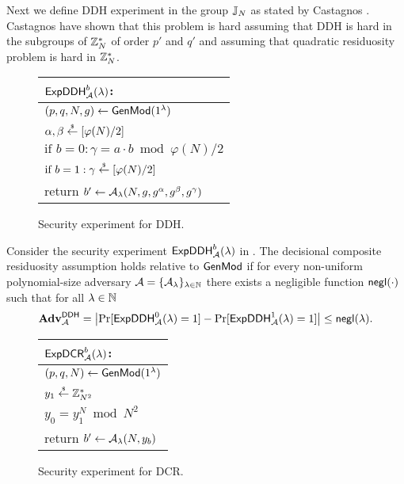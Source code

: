Next we define DDH experiment in the group $\mathbb{J}_N$ as stated by Castagnos \etal \cite{C:CouPetPoi16}. Castagnos \etal have shown that this problem is hard assuming that DDH is hard in the subgroups of $\mathbb{Z}_N^*$ of order $p'$ and $q'$ and assuming that quadratic residuosity problem is hard in $\mathbb{Z}_N^*$.  

\begin{figure}[h]
\begin{center}
\begin{tabular}{l}
$\mathsf{ExpDDH}_{\mathcal{A}}^{b}(\lambda)$: \\
\hline
$(p, q, N,g) \leftarrow \mathsf{GenMod}(1{^{\lambda}})$ \\
$\alpha, \beta \stackrel{{\scriptscriptstyle\$}}{\leftarrow} [\varphi(N)/2]$ \\
$\text{if } b = 0: \gamma = a\cdot b \bmod \varphi(N)/2$\\
$\text{if } b = 1: \gamma \stackrel{{\scriptscriptstyle\$}}{\leftarrow} [\varphi(N)/2]$ \\
return	$b' \leftarrow \mathcal{A}_{\lambda}(N,g,g^\alpha, g^\beta, g^\gamma)$
\end{tabular}
\end{center}
\caption{\label{fig:ddh}Security experiment for DDH.}
\end{figure}
 

\begin{definition}\label{thm:ddh}
Consider the security experiment $\mathsf{ExpDDH}_{\mathcal{A}}^{b}(\lambda)$ in .
The decisional composite residuosity assumption holds relative to $\mathsf{GenMod}$ if for every non-uniform polynomial-size adversary $\mathcal{A} = \{\mathcal{A}_{\lambda}\}_{\lambda \in \mathbb{N}}$ there exists a negligible function $\mathsf{negl}(\cdot)$ such that for all $\lambda \in \mathbb{N}$ 
\[\mathbf{Adv}^\mathsf{DDH}_{\mathcal{A}} = \left| \Pr[\mathsf{ExpDDH}_{\mathcal{A}}^{0}(\lambda) = 1] - \Pr[\mathsf{ExpDDH}_{\mathcal{A}}^{1}(\lambda) = 1] \right| \leq \mathsf{negl}(\lambda).\]
\end{definition} 

\begin{figure}[h]
\begin{center}
\begin{tabular}{l}
$\mathsf{ExpDCR}_{\mathcal{A}}^{b}(\lambda)$: \\
\hline
$(p, q, N) \leftarrow \mathsf{GenMod}(1{^{\lambda}})$ \\
$y_1 \stackrel{{\scriptscriptstyle\$}}{\leftarrow} \mathbb{Z}_{N^2}^*$ \\
$y_0 = y_1^N \bmod N^2$\\
return	$b' \leftarrow \mathcal{A}_{\lambda}(N,y_b)$
\end{tabular}
\end{center}
\caption{\label{fig:dcr}Security experiment for DCR.}
\end{figure}

